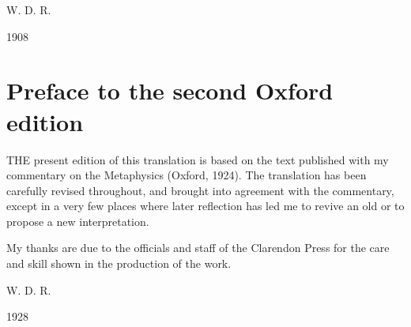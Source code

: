 \vspace{0.2in} 

W. D. R.

\vspace{0.1in} 

1908 

\section*{Preface to the second Oxford edition}

THE present edition of this translation is based on the text 
published with my commentary on the Metaphysics (Oxford, 
1924). The translation has been carefully revised throughout, 
and brought into agreement with the commentary, except in 
a very few places where later reflection has led me to revive 
an old or to propose a new interpretation. 

My thanks are due to the officials and staff of the Clarendon 
Press for the care and skill shown in the production of the 
work.

\vspace{0.2in} 

W. D. R.

\vspace{0.1in} 

1928 

\vfill

\mainmatter



\backmatter
%
%




\renewcommand{\aref}{}
\renewcommand{\bookname}{}
\renewcommand{\chaptermark}[1]{}
\renewcommand{\sectionmark}[1]{}

\printindex

\vfil



